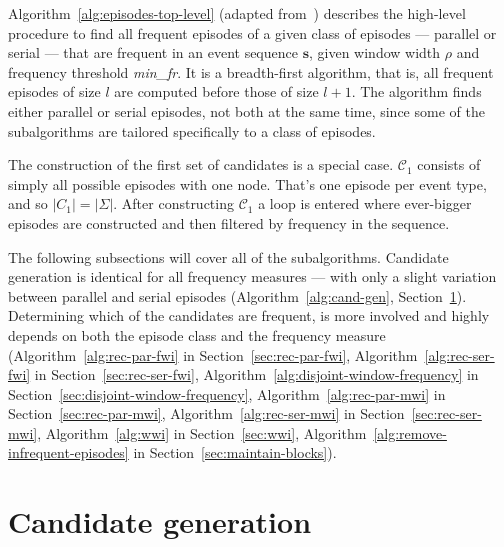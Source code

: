Algorithm~\ref{alg:episodes-top-level} (adapted from~\citep{mannila1997discovery}) describes the high-level procedure to find all frequent episodes of a given class of episodes --- parallel or serial --- that are frequent in an event sequence $ \boldsymbol{s} $, given window width $ \rho $ and frequency threshold \emph{min\_fr}. It is a breadth-first algorithm, that is, all frequent episodes of size $ l $ are computed before those of size $ l + 1 $. The algorithm finds either parallel or serial episodes, not both at the same time, since some of the subalgorithms are tailored specifically to a class of episodes.

The construction of the first set of candidates is a special case. $ \mathcal{C}_1 $ consists of simply all possible episodes with one node. That's one episode per event type, and so $ | C_1 | = | \Sigma | $. After constructing $ \mathcal{C}_1 $ a loop is entered where ever-bigger episodes are constructed and then filtered by frequency in the sequence.

The following subsections will cover all of the subalgorithms. Candidate generation is identical for all frequency measures --- with only a slight variation between parallel and serial episodes (Algorithm~\ref{alg:cand-gen}, Section~\ref{sec:cand-gen}). Determining which of the candidates are frequent, is more involved and highly depends on both the episode class and the frequency measure (Algorithm~\ref{alg:rec-par-fwi} in Section~\ref{sec:rec-par-fwi}, Algorithm~\ref{alg:rec-ser-fwi} in Section~\ref{sec:rec-ser-fwi}, Algorithm~\ref{alg:disjoint-window-frequency} in Section~\ref{sec:disjoint-window-frequency}, Algorithm~\ref{alg:rec-par-mwi} in Section~\ref{sec:rec-par-mwi}, Algorithm~\ref{alg:rec-ser-mwi} in Section~\ref{sec:rec-ser-mwi}, Algorithm~\ref{alg:wwi} in Section~\ref{sec:wwi}, Algorithm~\ref{alg:remove-infrequent-episodes} in Section~\ref{sec:maintain-blocks}).

\section{Candidate generation}
\label{sec:cand-gen}

